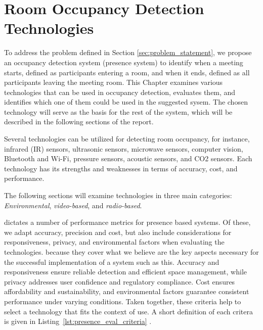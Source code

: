 \chapter{\label{sec:presence_intro}Room Occupancy Detection Technologies}
To address the problem defined in Section \ref{sec:problem_statement}, we propose an occupancy detection system (presence system) to identify when a meeting starts, defined as participants entering a room, and when it ends, defined as all participants leaving the meeting room.
This Chapter examines various technologies that can be used in occupancy detection, evaluates them, and identifies which one of them could be used in the suggested sysem.
The chosen technology will serve as the basis for the rest of the system, which will be described in the following sections of the report.

Several technologies can be utilized for detecting room occupancy, for instance, infrared (IR) sensors\cite{woodward-2021, dodierBuildingOccupancyDetection2006, OccupancySensorMotion}, ultrasonic sensors\cite{woodward-2021, dodierBuildingOccupancyDetection2006, OccupancySensorMotion}, microwave sensors\cite{woodward-2021}, computer vision\cite{co2sensor, longoAccurateOccupancyEstimation2019, OccupancySensorMotion}, Bluetooth and Wi-Fi\cite{teissedre-2019}, pressure sensors\cite{OccupancySensorMotion}, acoustic sensors\cite{OccupancySensorMotion}, and CO2 sensors\cite{co2sensor, longoAccurateOccupancyEstimation2019, jinSensingProxyOccupancy2015}.\cite{faragherLocationFingerprintingBluetooth2015}
Each technology has its strengths and weaknesses in terms of accuracy, cost, and performance.

The following sections will examine technologies in three main categories: \textit{Environmental}, \textit{video-based}, and \textit{radio-based}.

\citeauthor{presence_ble_review} \cite{presence_ble_review} dictates a number of performance metrics for presence based systems. Of these, we adapt accuracy, precision and cost, but also include considerations for responsiveness, privacy, and environmental factors when evaluating the technologies.
because they cover what we believe are the key aspects necessary for the successful implementation of a system such as this.
Accuracy and responsiveness ensure reliable detection and efficient space management, while privacy addresses user confidence and regulatory compliance.
Cost ensures affordability and sustainability, and environmental factors guarantee consistent performance under varying conditions.
Taken together, these criteria help to select a technology that fits the context of use.
A short definition of each critera is given in Listing~\ref{lst:presence_eval_criteria} .

